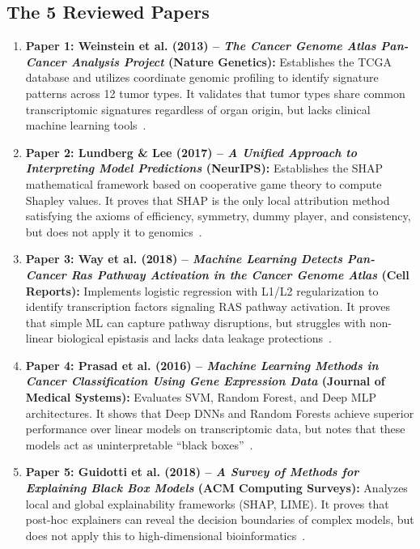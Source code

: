 \documentclass[journal,10pt]{IEEEtran}
\begin{document}
\subsection{The 5 Reviewed Papers}
\begin{enumerate}
    \item \textbf{Paper 1: Weinstein et al. (2013) – \textit{The Cancer Genome Atlas Pan-Cancer Analysis Project} (Nature Genetics):} Establishes the TCGA database and utilizes coordinate genomic profiling to identify signature patterns across 12 tumor types. It validates that tumor types share common transcriptomic signatures regardless of organ origin, but lacks clinical machine learning tools~\cite{tcga}.
    \item \textbf{Paper 2: Lundberg \& Lee (2017) – \textit{A Unified Approach to Interpreting Model Predictions} (NeurIPS):} Establishes the SHAP mathematical framework based on cooperative game theory to compute Shapley values. It proves that SHAP is the only local attribution method satisfying the axioms of efficiency, symmetry, dummy player, and consistency, but does not apply it to genomics~\cite{shap}.
    \item \textbf{Paper 3: Way et al. (2018) – \textit{Machine Learning Detects Pan-Cancer Ras Pathway Activation in the Cancer Genome Atlas} (Cell Reports):} Implements logistic regression with L1/L2 regularization to identify transcription factors signaling RAS pathway activation. It proves that simple ML can capture pathway disruptions, but struggles with non-linear biological epistasis and lacks data leakage protections~\cite{way}.
    \item \textbf{Paper 4: Prasad et al. (2016) – \textit{Machine Learning Methods in Cancer Classification Using Gene Expression Data} (Journal of Medical Systems):} Evaluates SVM, Random Forest, and Deep MLP architectures. It shows that Deep DNNs and Random Forests achieve superior performance over linear models on transcriptomic data, but notes that these models act as uninterpretable ``black boxes''~\cite{prasad}.
    \item \textbf{Paper 5: Guidotti et al. (2018) – \textit{A Survey of Methods for Explaining Black Box Models} (ACM Computing Surveys):} Analyzes local and global explainability frameworks (SHAP, LIME). It proves that post-hoc explainers can reveal the decision boundaries of complex models, but does not apply this to high-dimensional bioinformatics~\cite{guidotti}.
\end{enumerate}
\end{document}
